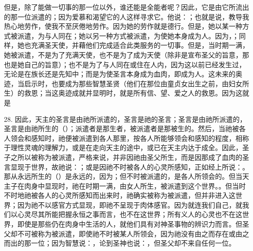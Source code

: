 但是，除了能做一切事的那一位以外，谁还能是全能者呢？因此，它是由它所流出的那一位派遣的；因为爱慕和渴望它的人这样寻求它。他说：；也就是说，教导我热心地劳作，使我不至厌倦地劳作。因为她的劳作就是德行。但是，她以某一种方式被派遣，为与人同在；她以另一种方式被派遣，为使她本身成为人。因为，；同样，她也充满圣天使，并藉他们完成适合此类服务的一切事。但是，当时期一满，她被派遣，不是为了充满天使，也不是为了成为天使（除非是宣布圣父的旨意，那也是她自己的旨意）；也不是为了与人同在或住在人内，因为这以前已经发生过，无论是在族长还是先知中；而是为使圣言本身成为血肉，即成为人。这未来的奥迹，当启示时，也要成为那些智慧圣贤（他们在那位由童贞女出生之前，由妇女所生）的救恩；当这奥迹成就并显明时，就是所有信、望、爱之人的救恩。因为这就是\par

28. 因此，天主的圣言是由祂所派遣的，圣言是祂的圣言；圣言是由祂所派遣的，圣言是由祂所生的（）；派遣者是那生者，被派遣者是那被生的。然后，当祂被各人领会和感知时，祂便被派遣到各人那里，按各人所能够领会和感知的程度，相称于理性灵魂的理解力，或是在走向天主的途中，或已在天主内达于成全。因此，圣子之所以被称为被派遣，严格来说，并非因祂由圣父所生，而是因那成了血肉的圣言显现于世界，故祂说：；或是因祂不时被各人的心灵所感知，正如经上所说：。那从永远所生的（）是永远的，因为；但不时被派遣的，是各人所领会的。但当天主子在肉身中显现时，祂在时期一满，由女人所生，被派遣到这个世界。。但当时不时地祂被各人的心灵所感知而出来时，祂确实被称为被派遣，但并非进入这世界；因为祂不以感官方式显现，即祂不呈现于肉体感官。因为就连我们自己，就我们以心灵尽其所能把握永恒之事而言，也不在这世界；所有义人的心灵也不在这世界，即使是那些仍在肉身中生活的人，就他们具有对神圣事物的辨识力而言。但圣父却不可被称为被派遣，即使祂不时被某人所领会，因为祂没有由之而存在或由之而出的那一位；因为智慧说：，论到圣神也说：，但圣父却不来自任何一位。\par


